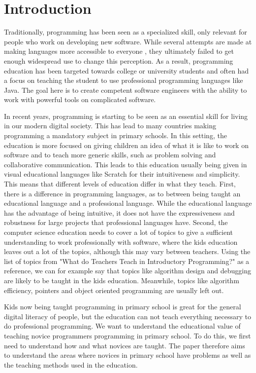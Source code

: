 \chapter{Introduction}
\label{chap:introduction}
Traditionally, programming has been seen as a specialized skill, only relevant for people who work on developing new software.
While several attempts are made at making languages more accessible to everyone , they ultimately failed to get enough widespread use to change this perception.
As a result, programming education has been targeted towards college or university students and often had a focus on teaching the student to use professional programming languages like Java.
The goal here is to create competent software engineers with the ability to work with powerful tools on complicated software.

In recent years, programming is starting to be seen as an essential skill for living in our modern digital society.
This has lead to many countries making programming a mandatory subject in primary schools. In this setting, the education is more focused on giving children an idea of what it is like to work on software and to teach more generic skills, such as problem solving and collaborative communication. This leads to this education usually being given in visual educational languages like Scratch \cite{MaloneyResnick10} for their intuitiveness and simplicity. This means that different levels of education differ in what they teach.
First, there is a difference in programming languages, as to between being taught an educational language and a professional language. While the educational language has the advantage of being intuitive, it does not have the expressiveness and robustness for large projects that professional languages have.
Second, the computer science education needs to cover a lot of topics to give a sufficient understanding to work professionally with software, where the kids education leaves out a lot of the topics, although this may vary between teachers.
Using the list of topics from "What do Teachers Teach in Introductory Programming?"\cite{WhatDoTeach06} as a reference, we can for example say that topics like algorithm design and debugging are likely to be taught in the kids education. Meanwhile, topics like algorithm efficiency, pointers and object oriented programming are usually left out.

Kids now being taught programming in primary school is great for the general digital literacy of people, but the education can not teach everything necessary to do professional programming.
We want to understand the educational value of teaching novice programmers programming in primary school. To do this, we first need to understand how and what novices are taught. The paper therefore aims to understand the areas where novices in primary school have problems as well as the teaching methods used in the education.

